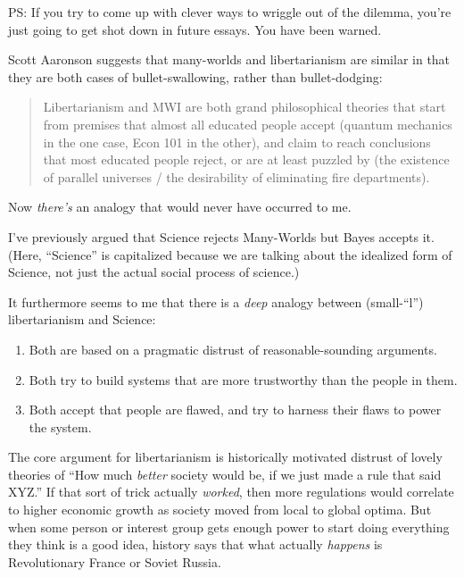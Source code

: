 {
 PS: If you try to come up with clever ways to wriggle out of the
dilemma, you're just going to get shot down in future
essays. You have been warned.}

\myendsectiontext


{
 Scott Aaronson suggests that many-worlds and libertarianism are
similar in that they are both cases of bullet-swallowing, rather than
bullet-dodging:}

\begin{quote}
{
 Libertarianism and MWI are both grand philosophical theories that
start from premises that almost all educated people accept (quantum
mechanics in the one case, Econ 101 in the other), and claim to reach
conclusions that most educated people reject, or are at least puzzled
by (the existence of parallel universes / the desirability of
eliminating fire departments).}
\end{quote}

{
 Now \textit{there's} an analogy that would never
have occurred to me.}

{
 I've previously argued that Science rejects
Many-Worlds but Bayes accepts it. (Here,
``Science'' is capitalized because
we are talking about the idealized form of Science, not just the actual
social process of science.)}

{
 It furthermore seems to me that there is a \textit{deep} analogy
between (small-``l'') libertarianism
and Science:}

\begin{enumerate}
\item {
 Both are based on a pragmatic distrust of reasonable-sounding
arguments.}

\item {
 Both try to build systems that are more trustworthy than the
people in them.}

\item {
 Both accept that people are flawed, and try to harness their flaws
 to power the system.}
\end{enumerate}

{
 The core argument for libertarianism is historically motivated
distrust of lovely theories of ``How much
\textit{better} society would be, if we just made a rule that said
XYZ.'' If that sort of trick actually
\textit{worked}, then more regulations would correlate to higher
economic growth as society moved from local to global optima. But when
some person or interest group gets enough power to start doing
everything they think is a good idea, history says that what actually
\textit{happens} is Revolutionary France or Soviet Russia.}

